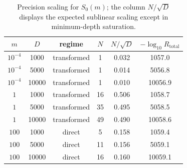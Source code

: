 \begin{table}[t]
\centering
\small
\begin{tabular}{c c c c c c}
\hline
$m$ & $D$ & regime & $N$ & $N/\sqrt{D}$ & $-\log_{10}R_{\mathrm{total}}$ \\
\hline
$10^{-4}$ & 1000 & transformed & 1 & 0.032 & 1057.0 \\
$10^{-4}$ & 5000 & transformed & 1 & 0.014 & 5056.8 \\
$10^{-4}$ & 10000 & transformed & 1 & 0.010 & 10056.9 \\
$1$ & 1000 & transformed & 16 & 0.506 & 1058.7 \\
$1$ & 5000 & transformed & 35 & 0.495 & 5058.5 \\
$1$ & 10000 & transformed & 49 & 0.490 & 10058.6 \\
$100$ & 1000 & direct & 5 & 0.158 & 1059.4 \\
$100$ & 5000 & direct & 11 & 0.156 & 5059.1 \\
$100$ & 10000 & direct & 16 & 0.160 & 10059.1 \\
\hline
\end{tabular}
\caption{Precision scaling for $S_0(m)$; the column $N/\sqrt{D}$ displays the expected sublinear scaling except in minimum-depth saturation.}
\label{tab:precision-a0}
\end{table}
